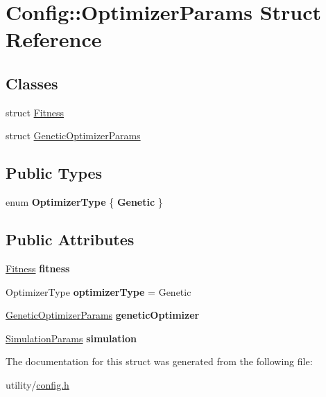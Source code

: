 \hypertarget{struct_config_1_1_optimizer_params}{}\section{Config\+:\+:Optimizer\+Params Struct Reference}
\label{struct_config_1_1_optimizer_params}
\subsection*{Classes}
\begin{DoxyCompactItemize}
\item 
struct \hyperlink{struct_config_1_1_optimizer_params_1_1_fitness}{Fitness}
\item 
struct \hyperlink{struct_config_1_1_optimizer_params_1_1_genetic_optimizer_params}{Genetic\+Optimizer\+Params}
\end{DoxyCompactItemize}
\subsection*{Public Types}
\begin{DoxyCompactItemize}
\item 
\hypertarget{struct_config_1_1_optimizer_params_a5af58e4f3cf954086eaf5e8b43412a23}{}\label{struct_config_1_1_optimizer_params_a5af58e4f3cf954086eaf5e8b43412a23} 
enum {\bfseries Optimizer\+Type} \{ {\bfseries Genetic}
 \}
\end{DoxyCompactItemize}
\subsection*{Public Attributes}
\begin{DoxyCompactItemize}
\item 
\hypertarget{struct_config_1_1_optimizer_params_a556b51c730b3f5b3640de00247cb9148}{}\label{struct_config_1_1_optimizer_params_a556b51c730b3f5b3640de00247cb9148} 
\hyperlink{struct_config_1_1_optimizer_params_1_1_fitness}{Fitness} {\bfseries fitness}
\item 
\hypertarget{struct_config_1_1_optimizer_params_a3f676c6d7b5e15253620c16859663b2c}{}\label{struct_config_1_1_optimizer_params_a3f676c6d7b5e15253620c16859663b2c} 
Optimizer\+Type {\bfseries optimizer\+Type} = Genetic
\item 
\hypertarget{struct_config_1_1_optimizer_params_a76fac8f9bcac64ee0a1694faec04d084}{}\label{struct_config_1_1_optimizer_params_a76fac8f9bcac64ee0a1694faec04d084} 
\hyperlink{struct_config_1_1_optimizer_params_1_1_genetic_optimizer_params}{Genetic\+Optimizer\+Params} {\bfseries genetic\+Optimizer}
\item 
\hypertarget{struct_config_1_1_optimizer_params_a9d96a4d78bec250c3742eb5dc3ada304}{}\label{struct_config_1_1_optimizer_params_a9d96a4d78bec250c3742eb5dc3ada304} 
\hyperlink{struct_config_1_1_simulation_params}{Simulation\+Params} {\bfseries simulation}
\end{DoxyCompactItemize}


The documentation for this struct was generated from the following file\+:\begin{DoxyCompactItemize}
\item 
utility/\hyperlink{config_8h}{config.\+h}\end{DoxyCompactItemize}
